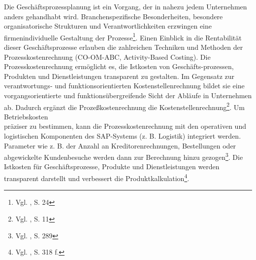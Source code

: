 Die Geschäftsprozessplanung ist ein Vorgang, der in nahezu jedem Unternehmen anders gehandhabt wird. Branchenspezifische Besonderheiten, besondere organisatorische Strukturen und Verantwortlichkeiten erzwingen eine firmenindividuelle Gestaltung der Prozesse\footnote{Vgl. \cite{Friedl2008}, S. 24}. Einen Einblick in die Rentabilität dieser Geschäftsprozesse erlauben die zahlreichen Techniken und Methoden der Prozesskostenrechnung (CO-OM-ABC, Activity-Based Costing). Die Prozesskostenrechnung ermöglicht es, die Istkosten von Geschäfts-prozessen, Produkten und Dienstleistungen transparent zu gestalten. Im Gegensatz zur verantwortungs- und funktionsorientierten Kostenstellenrechnung bildet sie eine vorgangsorientierte und funktionsübergreifende Sicht der Abläufe in Unternehmen ab. Dadurch ergänzt die Prozeßkostenrechnung die Kostenstellenrechnung\footnote{Vgl. \cite{SAPCOOMABC2001}, S. 11}. 
Um Betriebskosten \\präziser zu bestimmen, kann die Prozesskostenrechnung mit den operativen und logistischen Komponenten des SAP-Systems (z. B. Logistik) integriert werden. Parameter wie z. B. der Anzahl an Kreditorenrechnungen, Bestellungen oder abgewickelte Kundenbesuche werden dann zur Berechnung hinzu gezogen\footnote{Vgl. \cite{Patel2009}, S. 289}. 
Die Istkosten für Geschäftsprozesse, Produkte und Dienstleistungen werden transparent darstellt und verbessert die Produktkalkulation\footnote{Vgl. \cite{Patel2009}, S. 318 f.}.


